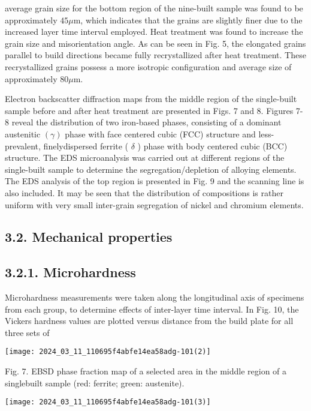 \documentclass[10pt]{article}
\begin{document}
average grain size for the bottom region of the nine-built sample was found to be approximately $45 \mu \mathrm{m}$, which indicates that the grains are slightly finer due to the increased layer time interval employed. Heat treatment was found to increase the grain size and misorientation angle. As can be seen in Fig. 5, the elongated grains parallel to build directions became fully recrystallized after heat treatment. These recrystallized grains possess a more isotropic configuration and average size of approximately $80 \mu \mathrm{m}$.

Electron backscatter diffraction maps from the middle region of the single-built sample before and after heat treatment are presented in Figs. 7 and 8. Figures 7-8 reveal the distribution of two iron-based phases, consisting of a dominant austenitic $(\gamma)$ phase with face centered cubic (FCC) structure and less-prevalent, finelydispersed ferrite ( $\delta$ ) phase with body centered cubic (BCC) structure. The EDS microanalysis was carried out at different regions of the single-built sample to determine the segregation/depletion of alloying elements. The EDS analysis of the top region is presented in Fig. 9 and the scanning line is also included. It may be seen that the distribution of compositions is rather uniform with very small inter-grain segregation of nickel and chromium elements.

\subsection*{3.2. Mechanical properties}
\subsection*{3.2.1. Microhardness}
Microhardness measurements were taken along the longitudinal axis of specimens from each group, to determine effects of inter-layer time interval. In Fig. 10, the Vickers hardness values are plotted versus distance from the build plate for all three sets of

\begin{center}
\texttt{[image: 2024\_03\_11\_110695f4abfe14ea58adg-101(2)]}
\end{center}

Fig. 7. EBSD phase fraction map of a selected area in the middle region of a singlebuilt sample (red: ferrite; green: austenite).

\begin{center}
\texttt{[image: 2024\_03\_11\_110695f4abfe14ea58adg-101(3)]}
\end{center}
\end{document}
